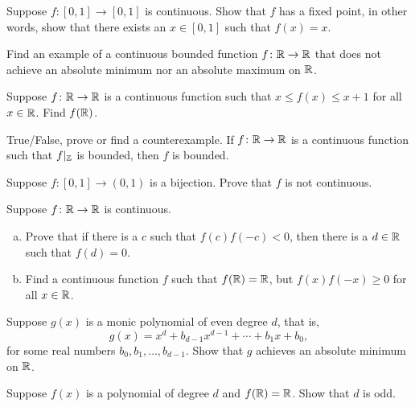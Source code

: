 \begin{exercise}
Suppose $f \colon [0,1] \to [0,1]$ is continuous.  Show that $f$
has a fixed point, in other words, show that there exists an $x \in [0,1]$ such that
$f(x) = x$.
\end{exercise}

\begin{exercise}
Find an example of a continuous bounded function $f \colon {\mathbb{R}} \to {\mathbb{R}}$ that does
not achieve an absolute minimum nor an absolute maximum on ${\mathbb{R}}$.
\end{exercise}

\begin{exercise}
Suppose $f \colon {\mathbb{R}} \to {\mathbb{R}}$ is a continuous function such that
$x \leq f(x) \leq x+1$ for all $x \in {\mathbb{R}}$.  Find $f({\mathbb{R}})$.
\end{exercise}

\begin{exercise}
True/False, prove or find a counterexample.  If $f \colon {\mathbb{R}} \to
{\mathbb{R}}$ is a continuous function such that $f|_{{\mathbb{Z}}}$ is bounded, then $f$
is bounded.
\end{exercise}

\begin{exercise}
Suppose $f \colon [0,1] \to (0,1)$ is a bijection.  Prove that $f$ is not
continuous.
\end{exercise}

\begin{exercise}
Suppose $f \colon {\mathbb{R}} \to {\mathbb{R}}$ is continuous.
\begin{enumerate}[a)]
\item
Prove that if there is a $c$ such that $f(c)f(-c) < 0$,
then there is a $d \in {\mathbb{R}}$ such that $f(d) = 0$.
\item
Find a continuous function $f$ such that
$f({\mathbb{R}}) = {\mathbb{R}}$, but $f(x)f(-x) \geq 0$ for all $x \in {\mathbb{R}}$.
\end{enumerate}
\end{exercise}

\begin{exercise}
Suppose $g(x)$ is a monic polynomial of even degree $d$, that is,
\begin{equation*}
g(x) = x^d + b_{d-1} x^{d-1} + \cdots + b_1 x + b_0 ,
\end{equation*}
for some real numbers $b_{0}, b_1, \ldots, b_{d-1}$.
Show that $g$ achieves an absolute minimum on ${\mathbb{R}}$.
\end{exercise}

\begin{exercise}
Suppose $f(x)$ is a polynomial of degree $d$ and 
$f({\mathbb{R}}) = {\mathbb{R}}$.  Show that $d$ is odd.
\end{exercise}


